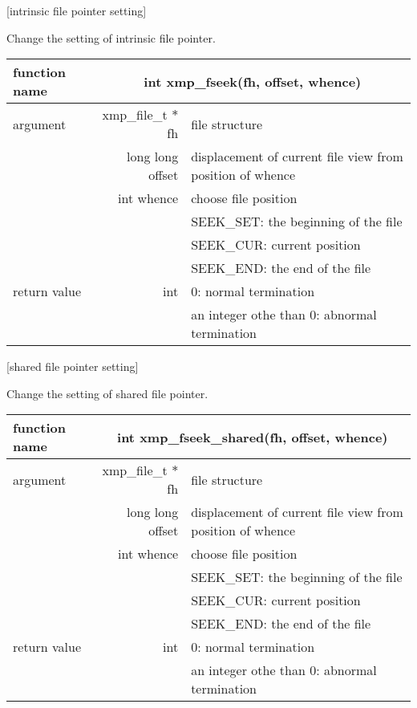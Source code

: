    [intrinsic file pointer setting]

   Change the setting of intrinsic file pointer.
   \begin{table}[h]
    \begin{center}
     \begin{tabular}{|l|r|p{70mm}|}
      \hline
      {\bf function name}  & \multicolumn{2}{c|}{\bf int xmp\_fseek(fh,
      offset, whence)}  \\ \hline \hline
      argument & xmp\_file\_t $*$fh & file structure \\ \cline{2-3}
      & long long offset & displacement of current file view from
	      position of whence \\ \cline{2-3}
      & int whence & choose file position \\
      &  & SEEK\_SET: the beginning of the file \\ 
      &  & SEEK\_CUR: current position \\ 
      &  & SEEK\_END: the end of the file \\ \hline
      return value & int & 0: normal termination \\
      &  & an integer othe than 0: abnormal termination \\ \hline
      \end{tabular}
     \end{center}
    \label{tb:aaa}
   \end{table}

   \clearpage

   [shared file pointer setting]

   Change the setting of shared file pointer.
   \begin{table}[h]
    \begin{center}
     \begin{tabular}{|l|r|p{80mm}|}
      \hline
      {\bf function name}  & \multicolumn{2}{c|}{\bf int xmp\_fseek\_shared(fh,
      offset, whence)}  \\ \hline \hline
      argument & xmp\_file\_t $*$fh & file structure \\ \cline{2-3}
      & long long offset & displacement of current file view from
	      position of whence \\ \cline{2-3}
      & int whence & choose file position \\
      &  & SEEK\_SET: the beginning of the file \\ 
      &  & SEEK\_CUR: current position \\ 
      &  & SEEK\_END: the end of the file \\ \hline
      return value & int & 0: normal termination \\
      &  & an integer othe than 0: abnormal termination \\ \hline
      \end{tabular}
     \end{center}
    \label{tb:aaa}
   \end{table}


